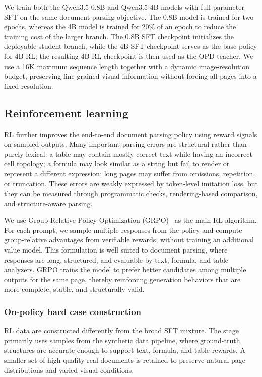 We train both the Qwen3.5-0.8B and Qwen3.5-4B models with full-parameter SFT on the same document parsing objective. The 0.8B model is trained for two epochs, whereas the 4B model is trained for 20\% of an epoch to reduce the training cost of the larger branch. The 0.8B SFT checkpoint initializes the deployable student branch, while the 4B SFT checkpoint serves as the base policy for 4B RL; the resulting 4B RL checkpoint is then used as the OPD teacher. We use a 16K maximum sequence length together with a dynamic image-resolution budget, preserving fine-grained visual information without forcing all pages into a fixed resolution.

\subsection{Reinforcement learning}

RL further improves the end-to-end document parsing policy using reward signals on sampled outputs. Many important parsing errors are structural rather than purely lexical: a table may contain mostly correct text while having an incorrect cell topology; a formula may look similar as a string but fail to render or represent a different expression; long pages may suffer from omissions, repetition, or truncation. These errors are weakly expressed by token-level imitation loss, but they can be measured through programmatic checks, rendering-based comparison, and structure-aware parsing.

We use Group Relative Policy Optimization (GRPO)~\cite{shao2024deepseekmath} as the main RL algorithm. For each prompt, we sample multiple responses from the policy and compute group-relative advantages from verifiable rewards, without training an additional value model. This formulation is well suited to document parsing, where responses are long, structured, and evaluable by text, formula, and table analyzers. GRPO trains the model to prefer better candidates among multiple outputs for the same page, thereby reinforcing generation behaviors that are more complete, stable, and structurally valid.

\subsubsection{On-policy hard case construction}

RL data are constructed differently from the broad SFT mixture. The stage primarily uses samples from the synthetic data pipeline, where ground-truth structures are accurate enough to support text, formula, and table rewards. A smaller set of high-quality real documents is retained to preserve natural page distributions and varied visual conditions.

